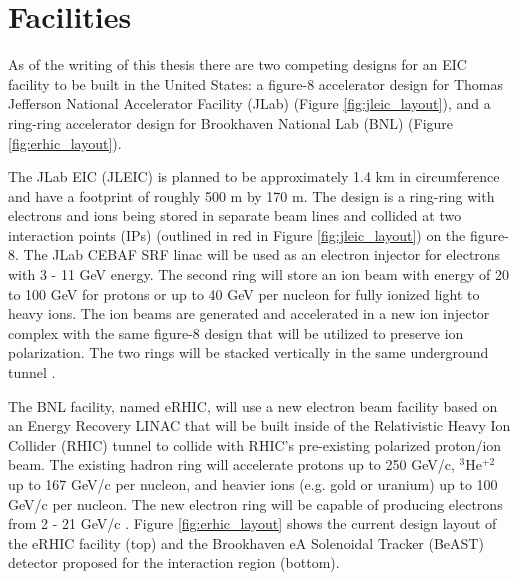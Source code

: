 \section{Facilities}
As of the writing of this thesis there are two competing designs for an EIC facility to be built in the United States: a figure-8 accelerator design for Thomas Jefferson National Accelerator Facility (JLab) (Figure \ref{fig:jleic_layout}), and a ring-ring accelerator design for Brookhaven National Lab (BNL) (Figure \ref{fig:erhic_layout}).

The JLab EIC (JLEIC) is planned to be approximately 1.4 km in circumference and have a footprint of roughly 500 m by 170 m. The design is a ring-ring with electrons and ions being stored in separate beam lines and collided at two interaction points  (IPs) (outlined in red in Figure \ref{fig:jleic_layout}) on the figure-8. The JLab CEBAF SRF linac will be used as an electron injector for electrons with 3 - 11 GeV energy. The second ring will store an ion beam with energy of 20 to 100 GeV for protons or up to 40 GeV per nucleon for fully ionized light to heavy ions. The ion beams are generated and accelerated in a new ion injector complex with the same figure-8 design that will be utilized to preserve ion polarization. The two rings will be stacked vertically in the same underground tunnel \cite{JLEICdesign}.

The BNL facility, named eRHIC, will use a new electron beam facility based on an Energy Recovery LINAC that will be built inside of the Relativistic Heavy Ion Collider (RHIC) tunnel to collide with RHIC's pre-existing polarized proton/ion beam. The existing hadron ring will accelerate protons up to 250 GeV/c, $^3$He$^{+2}$ up to 167 GeV/c per nucleon, and heavier ions (e.g. gold or uranium) up to 100 GeV/c per nucleon. The new electron ring will be capable of producing electrons from 2 - 21 GeV/c \cite{eRHICdesign}. Figure \ref{fig:erhic_layout} shows the current design layout of the eRHIC facility (top) and the Brookhaven eA Solenoidal Tracker (BeAST) detector proposed for the interaction region (bottom).

